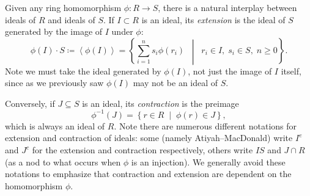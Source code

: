 \documentclass[Notebook.tex]{subfiles}
\begin{document}
\hrulefill

Given any ring homomorphism $\phi: R\to S$, there is a natural interplay between ideals of $R$ and ideals of $S$. If $I\subset R$ is an ideal, its \emph{extension} is the ideal of $S$ generated by the image of $I$ under $\phi$:
\[
\phi(I)\cdot S \coloneqq \left \langle \phi(I) \right\rangle
= \left\{\sum_{i=1}^n s_i \phi(r_i) \;\; \middle|\;\; r_i\in I,\; s_i\in S,\; n\geq 0\right\}.
\]
Note we must take the ideal generated by $\phi(I)$, not just the image of $I$ itself, since as we previously saw $\phi(I)$ may not be an ideal of $S$.

Conversely, if $J\subseteq S$ is an ideal, its \emph{contraction} is the preimage
\[
\phi^{-1}(J) = \left\{r\in R\;\; \big|\;\; \phi(r)\in J\right\},
\]
which is always an ideal of $R$. Note there are numerous different notations for extension and contraction of ideals: some (namely Atiyah--MacDonald) write $I^{e}$ and $J^{c}$ for the extension and contraction respectively, others write $IS$ and $J\cap R$ (as a nod to what occurs when $\phi$ is an injection). We generally avoid these notations to emphasize that contraction and extension are dependent on the homomorphism $\phi$.

\hrulefill

\newpage
\end{document}
